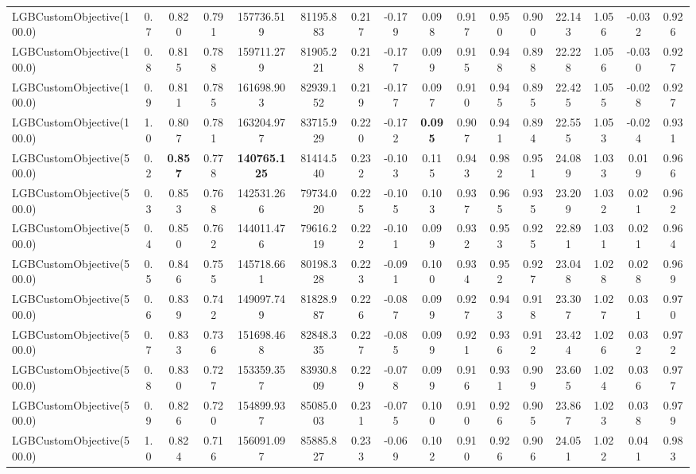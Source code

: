 \documentclass[11pt]{article}
\theoremstyle{plain}
\theoremstyle{definition}
\newcommand{\1}{\mathbf{1}}
\begin{document}
\begin{table}[h]
{\begin{tabular}{lccccccccccccccc}
LGBCustomObjective(100.0) & 0.7 & 0.820 & 0.791 & 157736.519 & 81195.883 & 0.217 & -0.179 & 0.098 & 0.917 & 0.950 & 0.900 & 22.143 & 1.056 & -0.032 & 0.926 \\
LGBCustomObjective(100.0) & 0.8 & 0.815 & 0.788 & 159711.279 & 81905.221 & 0.218 & -0.177 & 0.099 & 0.915 & 0.948 & 0.898 & 22.228 & 1.056 & -0.030 & 0.927 \\
LGBCustomObjective(100.0) & 0.9 & 0.811 & 0.785 & 161698.903 & 82939.152 & 0.219 & -0.177 & 0.097 & 0.910 & 0.945 & 0.895 & 22.425 & 1.055 & -0.028 & 0.927 \\
LGBCustomObjective(100.0) & 1.0 & 0.807 & 0.781 & 163204.977 & 83715.929 & 0.220 & -0.172 & \textbf{0.095} & 0.907 & 0.941 & 0.894 & 22.555 & 1.053 & -0.024 & 0.931 \\
LGBCustomObjective(500.0) & 0.2 & \textbf{0.857} & 0.778 & \textbf{140765.125} & 81414.540 & 0.232 & -0.103 & 0.115 & 0.943 & 0.982 & 0.951 & 24.089 & 1.033 & 0.019 & 0.966 \\
LGBCustomObjective(500.0) & 0.3 & 0.853 & 0.768 & 142531.266 & 79734.020 & 0.225 & -0.105 & 0.103 & 0.937 & 0.965 & 0.935 & 23.209 & 1.032 & 0.021 & 0.962 \\
LGBCustomObjective(500.0) & 0.4 & 0.850 & 0.762 & 144011.476 & 79616.219 & 0.222 & -0.101 & 0.099 & 0.932 & 0.953 & 0.925 & 22.891 & 1.031 & 0.021 & 0.964 \\
LGBCustomObjective(500.0) & 0.5 & 0.846 & 0.755 & 145718.661 & 80198.328 & 0.223 & -0.091 & 0.100 & 0.934 & 0.952 & 0.927 & 23.048 & 1.028 & 0.028 & 0.969 \\
LGBCustomObjective(500.0) & 0.6 & 0.839 & 0.742 & 149097.749 & 81828.987 & 0.226 & -0.087 & 0.099 & 0.927 & 0.943 & 0.918 & 23.307 & 1.027 & 0.031 & 0.970 \\
LGBCustomObjective(500.0) & 0.7 & 0.833 & 0.736 & 151698.468 & 82848.335 & 0.227 & -0.085 & 0.099 & 0.921 & 0.936 & 0.912 & 23.424 & 1.026 & 0.032 & 0.972 \\
LGBCustomObjective(500.0) & 0.8 & 0.830 & 0.727 & 153359.357 & 83930.809 & 0.229 & -0.078 & 0.099 & 0.916 & 0.931 & 0.909 & 23.605 & 1.024 & 0.036 & 0.977 \\
LGBCustomObjective(500.0) & 0.9 & 0.826 & 0.720 & 154899.937 & 85085.003 & 0.231 & -0.075 & 0.100 & 0.910 & 0.926 & 0.905 & 23.867 & 1.023 & 0.038 & 0.979 \\
LGBCustomObjective(500.0) & 1.0 & 0.824 & 0.716 & 156091.097 & 85885.827 & 0.233 & -0.069 & 0.102 & 0.910 & 0.926 & 0.906 & 24.051 & 1.022 & 0.041 & 0.983 \\

\end{tabular}}
\end{table}
\end{document}
